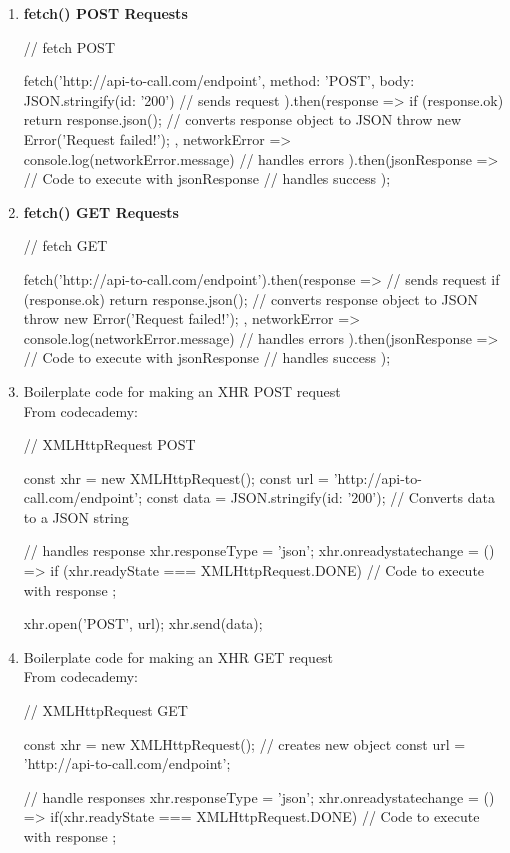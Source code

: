 \documentclass[a4paper,12pt]{article}
\begin{document}
\begin{enumerate}
\item \textbf{fetch() POST Requests}
\begin{jscode}
// fetch POST

fetch('http://api-to-call.com/endpoint', {
  method: 'POST',
  body: JSON.stringify({id: '200'}) // sends request
}).then(response => {
  if (response.ok){
    return response.json(); // converts response object to JSON
  }
  throw new Error('Request failed!');
}, networkError => console.log(networkError.message) // handles errors
).then(jsonResponse => {
  // Code to execute with jsonResponse // handles success
});
\end{jscode}

\item \textbf{fetch() GET Requests}
\begin{jscode}
// fetch GET

fetch('http://api-to-call.com/endpoint').then(response => { // sends request
  if (response.ok){
    return response.json(); // converts response object to JSON
  }
  throw new Error('Request failed!');
}, networkError => console.log(networkError.message) // handles errors
).then(jsonResponse => {
  // Code to execute with jsonResponse // handles success
});
\end{jscode}

\item Boilerplate code for making an XHR POST request\\
From codecademy:
\begin{jscode}
// XMLHttpRequest POST

const xhr = new XMLHttpRequest();
const url = 'http://api-to-call.com/endpoint';
const data = JSON.stringify({id: '200'});  // Converts data to a JSON string

// handles response
xhr.responseType = 'json';
xhr.onreadystatechange = () => {
  if (xhr.readyState === XMLHttpRequest.DONE){
    // Code to execute with response
  }
};

xhr.open('POST', url);
xhr.send(data);
\end{jscode}

\item Boilerplate code for making an XHR GET request\\
From codecademy:
\begin{jscode}
// XMLHttpRequest GET

const xhr = new XMLHttpRequest(); // creates new object
const url = 'http://api-to-call.com/endpoint';

// handle responses
xhr.responseType = 'json';
xhr.onreadystatechange = () => {
  if(xhr.readyState === XMLHttpRequest.DONE){
    // Code to execute with response
  }
};


\end{jscode}
\end{enumerate}
\end{document}
